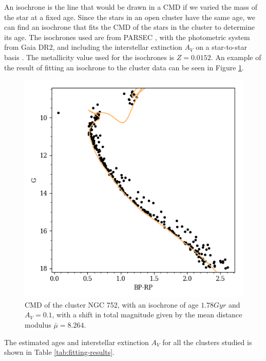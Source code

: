 \documentclass[twocolumn]{revtex4}
\begin{document}
An isochrone is the line that would be drawn in a CMD if we varied the mass of the star at a fixed age. Since the stars in an open cluster have the same age, we can find an isochrone that fits the CMD of the stars in the cluster to determine its age. The isochrones used are from PARSEC \cite{parsec}, with the photometric system from Gaia DR2, and including the interstellar extinction $A_V$ on a star-to-star basis \cite{girardi}. The metallicity value used for the isochrones is $Z = 0.0152$. An example of the result of fitting an isochrone to the cluster data can be seen in Figure \ref{nice-isochrone}.

\begin{figure}[h!]
\centering
\includegraphics[scale=0.65]{NGC_752}
\caption{CMD of the cluster NGC 752, with an isochrone of age $1.78 \si{Gyr}$ and $A_V = 0.1$, with a shift in total magnitude given by the mean distance modulus $\bar{\mu} = 8.264$.}
\label{nice-isochrone}
\end{figure}

The estimated ages and interstellar extinction $A_V$ for all the clusters studied is shown in Table \ref{tab:fitting-results}.
\end{document}
